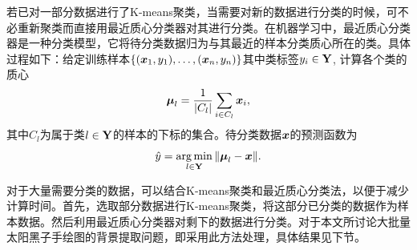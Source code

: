 \documentclass[UTF8,a4paper,twoside]{ctexart}
\DeclareMathOperator*{\argmin}{arg\,min}
\begin{document}
若已对一部分数据进行了K-means聚类，当需要对新的数据进行分类的时候，可不必重新聚类而直接用最近质心分类器对其进行分类。在机器学习中，最近质心分类器是一种分类模型，它将待分类数据归为与其最近的样本分类质心所在的类。具体过程如下：给定训练样本$\{(\vb*{x}_1,y_1), \ldots, (\vb*{x}_n,y_n)\}$其中类标签$y_i \in \vb{Y}$, 计算各个类的质心
\begin{equation}
\vb*{\mu}_l = \frac{1}{|C_l|} \sum_{i\in C_l} \vb*{x}_i,
\end{equation}
其中$C_l$为属于类$l\in \vb{Y}$的样本的下标的集合。待分类数据$\vb*{x}$的预测函数为
\begin{equation}
  \hat{y} = \argmin_{l\in \vb{Y}} \norm{\vb*{\mu}_l - \vb*{x}}.
\end{equation}

对于大量需要分类的数据，可以结合K-means聚类和最近质心分类法，以便于减少计算时间。首先，选取部分数据进行K-means聚类，将这部分已分类的数据作为样本数据。然后利用最近质心分类器对剩下的数据进行分类。对于本文所讨论大批量太阳黑子手绘图的背景提取问题，即采用此方法处理，具体结果见下节。


\end{document}
